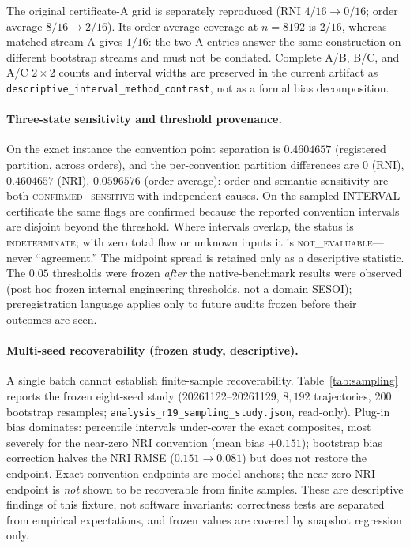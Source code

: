 The original certificate-A grid is separately reproduced (RNI $4/16\to0/16$;
order average $8/16\to2/16$). Its order-average coverage at $n=8192$ is $2/16$,
whereas matched-stream A gives $1/16$: the two A entries answer the same
construction on different bootstrap streams and must not be conflated. Complete
A/B, B/C, and A/C $2\times2$ counts and interval widths are preserved in the
current artifact as \texttt{descriptive\_interval\_method\_contrast}, not as a
formal bias decomposition.

\paragraph{Three-state sensitivity and threshold provenance.}
On the exact instance the convention point separation is $0.4604657$
(registered partition, across orders), and the per-convention partition
differences are $0$ (RNI), $0.4604657$ (NRI), $0.0596576$ (order average):
order and semantic sensitivity are both \textsc{confirmed\_sensitive} with
independent causes. On the sampled INTERVAL certificate the same flags are
confirmed because the reported convention intervals are disjoint beyond the
threshold. Where intervals overlap, the status is \textsc{indeterminate};
with zero total flow or unknown inputs it is \textsc{not\_evaluable}---never
``agreement.'' The midpoint spread is retained only as a descriptive
statistic. The $0.05$ thresholds were frozen \emph{after} the native-benchmark
results were observed (post hoc frozen internal engineering thresholds, not a
domain SESOI); preregistration language applies only to future audits frozen
before their outcomes are seen.

\paragraph{Multi-seed recoverability (frozen study, descriptive).}
A single batch cannot establish finite-sample recoverability.
Table~\ref{tab:sampling} reports the frozen eight-seed study
(20261122--20261129, $8{,}192$ trajectories, 200 bootstrap resamples;
\texttt{analysis\_r19\_sampling\_study.json}, read-only). Plug-in bias
dominates: percentile intervals under-cover the exact composites, most
severely for the near-zero NRI convention (mean bias $+0.151$); bootstrap
bias correction halves the NRI RMSE ($0.151\to0.081$) but does not restore
the endpoint. Exact convention endpoints are model anchors; the near-zero
NRI endpoint is \emph{not} shown to be recoverable from finite samples.
These are descriptive findings of this fixture, not software invariants:
correctness tests are separated from empirical expectations, and frozen values
are covered by snapshot regression only.

